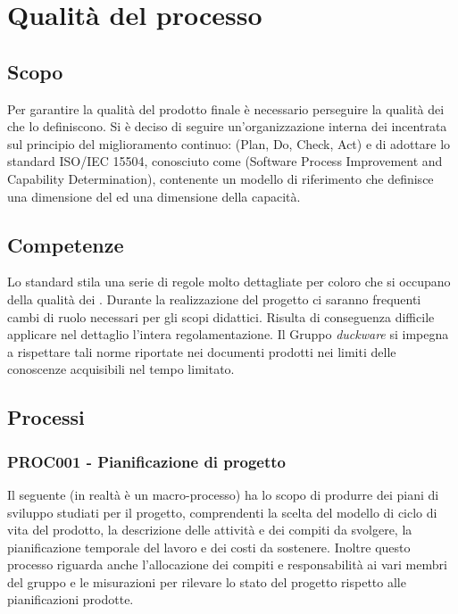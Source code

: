 \clearpage
\section{Qualità del processo}
\label{sec:qualita_processo}
\subsection{Scopo}
\label{sec:qualita_processo_scopo}
Per garantire la qualità del prodotto finale è necessario perseguire la qualità dei  che lo definiscono. Si è deciso di seguire un'organizzazione interna dei  incentrata sul principio del miglioramento continuo:  (Plan, Do, Check, Act) e di adottare lo standard ISO/IEC 15504, conosciuto come  (Software Process Improvement and Capability Determination), contenente un modello di riferimento che definisce una dimensione del  ed una dimensione della capacità.
\subsection{Competenze}
\label{sec:qualita_processo_competenze}
Lo standard stila una serie di regole molto dettagliate per coloro che si occupano della qualità dei . Durante la realizzazione del progetto ci saranno frequenti cambi di ruolo necessari per gli scopi didattici. Risulta di conseguenza difficile applicare nel dettaglio l'intera regolamentazione. Il Gruppo \emph{duckware} si impegna a rispettare tali norme riportate nei documenti prodotti nei limiti delle conoscenze acquisibili nel tempo limitato.
\subsection{Processi}
\label{sec:processi}
\subsubsection{PROC001 - Pianificazione di progetto}
\label{sec:processo_pianificazione_progetto}
Il seguente  (in realtà è un macro-processo) ha lo scopo di produrre dei piani di sviluppo studiati per il progetto, comprendenti la scelta del modello di ciclo di vita del prodotto, la descrizione delle attività e dei compiti da svolgere, la pianificazione temporale del lavoro e dei costi da sostenere. Inoltre questo processo riguarda anche l'allocazione dei compiti e responsabilità ai vari membri del gruppo e le misurazioni per rilevare lo stato del progetto rispetto alle pianificazioni prodotte.\\
